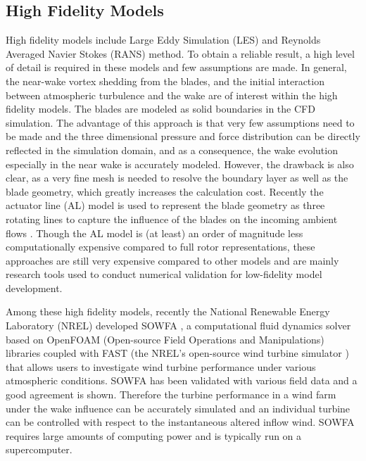 \documentclass{umthesis}
\begin{document}
\subsection{High Fidelity Models}
High fidelity models include Large Eddy Simulation (LES) \cite{Pope} and Reynolds Averaged Navier Stokes (RANS) method. To obtain a reliable result, a high level of detail is required in these models and few assumptions are made. In general, the near-wake vortex shedding from the blades, and the initial interaction between atmospheric turbulence and the wake are of interest within the high fidelity models. The blades are modeled as solid boundaries in the CFD simulation. The advantage of this approach is that very few assumptions need to be made and the three dimensional pressure and force distribution can be directly reflected in the simulation domain, and as a consequence, the wake evolution especially in the near wake is accurately modeled. However, the drawback is also clear, as a very fine mesh is needed to resolve the boundary layer as well as the blade geometry, which greatly increases the calculation cost. Recently the actuator line (AL) model is used to represent the blade geometry as three rotating lines to capture the influence of the blades on the incoming ambient flows \cite{Sørensen_2002}. Though the AL model is (at least) an order of magnitude less computationally expensive compared to full rotor representations, these approaches are still very expensive compared to other models and are mainly research tools used to conduct numerical validation for low-fidelity model development.

Among these high fidelity models, recently the National Renewable Energy Laboratory (NREL) developed SOWFA \cite{SOWFA}, a computational fluid dynamics solver based on OpenFOAM (Open-source Field Operations and Manipulations) libraries \cite{openfoam} coupled with FAST (the NREL’s open-source wind turbine simulator \cite{FAST}) that allows users to investigate wind turbine performance under various atmospheric conditions. SOWFA has been validated with various field data and a good agreement is shown. Therefore the turbine performance in a wind farm under the wake influence can be accurately simulated and an individual turbine can be controlled with respect to the instantaneous altered inflow wind. SOWFA requires large amounts of computing power and is typically run on a supercomputer.
\end{document}
